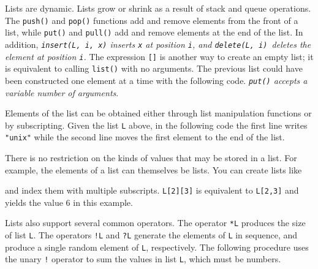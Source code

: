 Lists are dynamic. Lists grow or shrink as a result
of stack and queue operations. The \texttt{push()} and
\texttt{pop()} functions add and remove elements from the
front of a list, while \texttt{put()} and
\texttt{pull()} add and remove elements at the end of
the list. In addition,
{\em {}\texttt{insert(L, i, x)} inserts
\texttt{x} at position \texttt{i}, and
\texttt{delete(L, i)}\texttt{ }deletes the element
at position \texttt{i}.\/}
The expression \texttt{[]} is another
way to create an empty list; it is equivalent to
calling \texttt{list()} with no arguments.
The previous list could have been constructed one element at
a time with the following code.
{\em \texttt{put()} accepts a variable number of arguments\/}.


Elements of the list can be obtained either through list manipulation
functions or by subscripting. Given the list \texttt{L} above, in the
following code the first line writes
\texttt{"unix"} while the second line moves
the first element to the end of the list.


There is no restriction on the kinds of values that may be stored in a
list. For example, the elements of a list can themselves be lists. You
can create lists like


\noindent and index them with multiple subscripts. \texttt{L[2][3]} is
equivalent to \texttt{L[2,3]} and yields the value 6 in this example. 

Lists also support several common operators. The operator
\texttt{*L} produces the size of list \texttt{L}.
The operators \texttt{!L} and \texttt{?L} generate the elements of
\texttt{L} in sequence, and produce a single random element of
\texttt{L}, respectively. The following procedure uses the unary
\texttt{!} operator to sum the values in list \texttt{L}, which must be
numbers.


